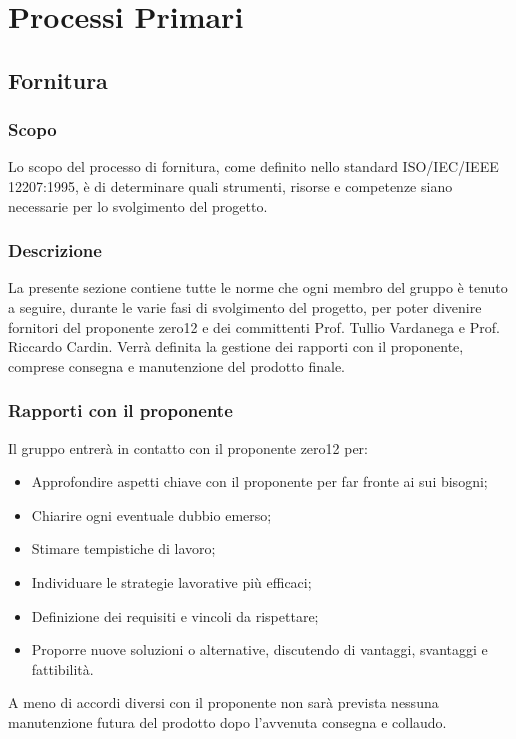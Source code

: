 \section{Processi Primari}
\subsection{Fornitura}
\subsubsection{Scopo}
Lo scopo del processo di fornitura, come definito nello standard ISO/IEC/IEEE 12207:1995, è di determinare quali strumenti, risorse e competenze siano necessarie per lo svolgimento del progetto. 

\subsubsection{Descrizione}
La presente sezione contiene tutte le norme che ogni membro del gruppo è tenuto a seguire, durante le varie fasi di svolgimento del progetto, per poter divenire fornitori del proponente zero12 e dei committenti Prof. Tullio Vardanega e Prof. Riccardo Cardin. 
Verrà definita la gestione dei rapporti con il proponente, comprese consegna e manutenzione del prodotto finale.

\subsubsection{Rapporti con il proponente}
Il gruppo entrerà in contatto con il proponente zero12 per:
\begin{itemize}
	\item Approfondire aspetti chiave con il proponente per far fronte ai sui bisogni; 
	\item Chiarire ogni eventuale dubbio emerso;
	\item Stimare tempistiche di lavoro;
	\item Individuare le strategie lavorative più efficaci;
	\item Definizione dei requisiti e vincoli da rispettare;
	\item Proporre nuove soluzioni o alternative, discutendo di vantaggi, svantaggi e fattibilità.
\end{itemize}
A meno di accordi diversi con il proponente non sarà prevista nessuna manutenzione futura del prodotto dopo l'avvenuta consegna e collaudo.

